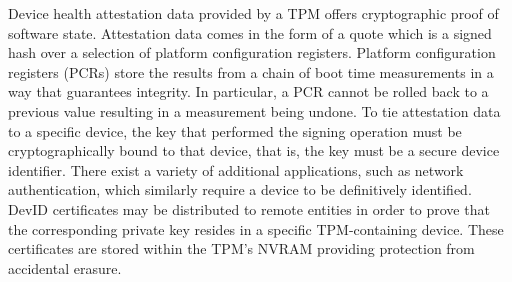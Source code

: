 \documentclass[runningheads]{llncs}
\begin{document}
Device health attestation data provided by a TPM offers cryptographic proof of software state. Attestation data comes in the form of a quote which is a signed hash over a selection of platform configuration registers. Platform configuration registers (PCRs) store the results from a chain of boot time measurements in a way that guarantees integrity. In particular, a PCR cannot be rolled back to a previous value resulting in a measurement being undone. To tie attestation data to a specific device, the key that performed the signing operation must be cryptographically bound to that device, that is, the key must be a secure device identifier. There exist a variety of additional applications, such as network authentication, which similarly require a device to be definitively identified. DevID certificates may be distributed to remote entities in order to prove that the corresponding private key resides in a specific TPM-containing device. These certificates are stored within the TPM's NVRAM providing protection from accidental erasure. 
\end{document}
